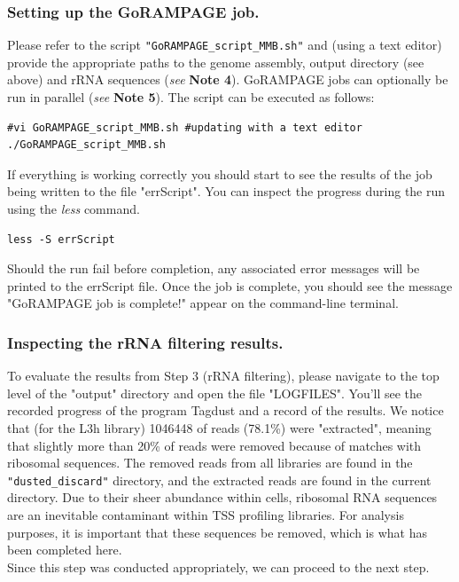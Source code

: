 \documentclass[runningheads,a4paper]{llncs}
\begin{document}
\begin{linenumbers}
\subsubsection{Setting up the GoRAMPAGE job.}
Please refer to the script \texttt{"GoRAMPAGE\_script\_MMB.sh"} and (using a text editor) provide the appropriate paths to the genome assembly, output directory (see above) and rRNA sequences (\textit{see} \textbf{Note 4}). 
GoRAMPAGE jobs can optionally be run in parallel (\textit{see} \textbf{Note 5}).
The script can be executed as follows:

\noindent
\begin{verbatim}
#vi GoRAMPAGE_script_MMB.sh #updating with a text editor
./GoRAMPAGE_script_MMB.sh
\end{verbatim}

\noindent
If everything is working correctly you should start to see the results of the job being written to the file "errScript".
You can inspect the progress during the run using the \textit{less} command. 

\noindent
\begin{verbatim}
less -S errScript
\end{verbatim}

\noindent
Should the run fail before completion, any associated error messages will be printed to the errScript file. Once the job is complete, you should see the message "GoRAMPAGE job is complete!" appear on the command-line terminal.

\subsubsection{Inspecting the rRNA filtering results.}

To evaluate the results from Step 3 (rRNA filtering), please navigate to the top level of the "output" directory and open the file "LOGFILES".
You'll see the recorded progress of the program Tagdust and a record of the results.
We notice that (for the L3h library) 1046448 of reads (78.1\%) were "extracted", meaning that slightly more than 20\% of reads were removed because of matches with ribosomal sequences.
The removed reads from all libraries are found in the \texttt{"dusted\_discard"} directory, and the extracted reads are found in the current directory. 
Due to their sheer abundance within cells, ribosomal RNA sequences are an inevitable contaminant within TSS profiling libraries. 
For analysis purposes, it is important that these sequences be removed, which is what has been completed here.\\
Since this step was conducted appropriately, we can proceed to the next step.


\end{linenumbers}
\end{document}
